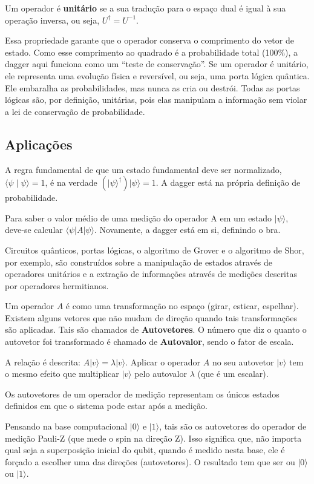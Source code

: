 \documentclass[12pt, a4paper]{article}
\newcommand{\ket}[1]{\lvert #1 \rangle}
\newcommand{\bra}[1]{\langle #1 \rvert}
\newcommand{\braket}[2]{\langle #1 \mid #2 \rangle}
\begin{document}
Um operador é \textbf{unitário} se a sua tradução para o espaço dual é igual à sua operação inversa, ou seja, $U^\dagger = U^{-1}$.

Essa propriedade garante que o operador conserva o comprimento do vetor de estado. Como esse comprimento ao quadrado é a probabilidade total (100\%), a dagger aqui funciona como um ``teste de conservação''. Se um operador é unitário, ele representa uma evolução física e reversível, ou seja, uma porta lógica quântica. Ele embaralha as probabilidades, mas nunca as cria ou destrói. Todas as portas lógicas são, por definição, unitárias, pois elas manipulam a informação sem violar a lei de conservação de probabilidade.

\subsection{Aplicações}

A regra fundamental de que um estado fundamental deve ser normalizado, $\braket{\psi}{\psi} = 1$, é  na verdade $(\ket{\psi}^\dagger)\ket{\psi} = 1$. A dagger está na própria definição de probabilidade.

Para saber o valor médio de uma medição do operador A em um estado $\ket{\psi}$, deve-se calcular $\bra{\psi}A\ket{\psi}$. Novamente, a dagger está em si, definindo o bra.

Circuitos quânticos, portas lógicas, o algoritmo de Grover e o algoritmo de Shor, por exemplo, são construídos sobre a manipulação de estados através de operadores unitários e a extração de informações através de medições descritas por operadores hermitianos.

Um operador $A$ é como uma transformação no espaço (girar, esticar, espelhar). Existem alguns vetores que não mudam de direção quando tais transformações são aplicadas. Tais são chamados de \textbf{Autovetores}. O número que diz o quanto o autovetor foi transformado é chamado de \textbf{Autovalor}, sendo o fator de escala.

A relação é descrita: $A\ket{v} = \lambda\ket{v}$. Aplicar o operador $A$ no seu autovetor $\ket{v}$ tem o mesmo efeito que multiplicar $\ket{v}$ pelo autovalor $\lambda$ (que é um escalar).

Os autovetores de um operador de medição representam os únicos estados definidos em que o sistema pode estar após a medição.

Pensando na base computacional $\ket{0}$ e $\ket{1}$, tais são os autovetores do operador de medição Pauli-Z (que mede o spin na direção Z). Isso significa que, não importa qual seja a superposição inicial do qubit, quando é medido nesta base, ele é forçado a escolher uma das direções (autovetores). O resultado tem que ser ou $\ket{0}$
ou $\ket{1}$.
\end{document}
